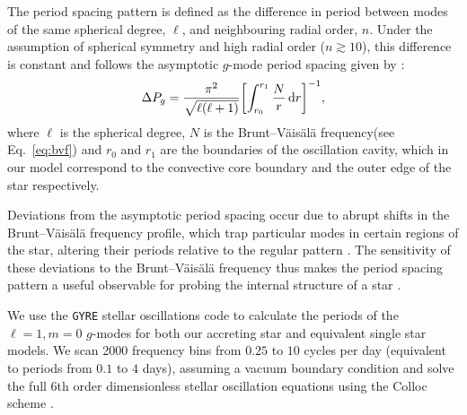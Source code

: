 \documentclass[twocolumn, twocolappendix, oneside]{aastex631}
\newcommand{\bvf}{Brunt–Väisälä frequency\xspace}
\newcommand{\gmode}{$g$-mode\xspace}
\newcommand{\gmodes}{$g$-modes\xspace}
\newcommand{\gyre}{\texttt{GYRE}\xspace}
\begin{document}
The period spacing pattern is defined as the difference in period between modes of the same spherical degree, $\ell$, and neighbouring radial order, $n$. Under the assumption of spherical symmetry and high radial order ($n \gtrsim 10$), this difference is constant and follows the asymptotic \gmode period spacing given by \citet{Tassoul+1980}:
\begin{equation}\label{eq:period-spacing}
    \Delta P_g = \frac{\pi^2}{\sqrt{\ell(\ell+1)}} \qty[\int_{r_0}^{r_1} \frac{N}{r} \dd{r}]^{-1},
\end{equation}
where $\ell$ is the spherical degree, $N$ is the \bvf (see Eq.~\ref{eq:bvf}) and $r_0$ and $r_1$ are the boundaries of the oscillation cavity, which in our model correspond to the convective core boundary and the outer edge of the star respectively.

Deviations from the asymptotic period spacing occur due to abrupt shifts in the \bvf profile, which trap particular modes in certain regions of the star, altering their periods relative to the regular pattern \citep[e.g.][]{Miglio+2008}. The sensitivity of these deviations to the \bvf thus makes the period spacing pattern a useful observable for probing the internal structure of a star \citep[e.g.][]{Aerts+2010}.

We use the \gyre stellar oscillations code \citep{Townsend+2013,Townsend+2018,Goldstein+2020,Sun+2023} to calculate the periods of the ${\ell = 1}, {m = 0}$ \gmodes for both our accreting star and equivalent single star models. We scan 2000 frequency bins from $0.25$ to $10$ cycles per day (equivalent to periods from $0.1$ to $4$ days), assuming a vacuum boundary condition and solve the full 6th order dimensionless stellar oscillation equations using the Colloc scheme \citep{Dziembowski+1971, Christensen-Dalsgaard+2008}.
\end{document}
